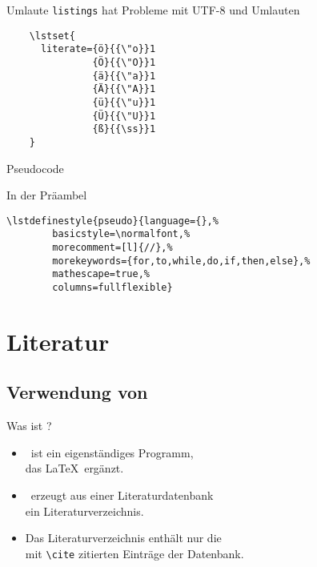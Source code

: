 \begin{Frame}[fragile]{Umlaute}
  \texttt{listings} hat Probleme mit UTF-8 und Umlauten
  \begin{lstlisting}[gobble=4]
    % german umlauts
    \lstset{
      literate={ö}{{\"o}}1
               {Ö}{{\"O}}1
               {ä}{{\"a}}1
               {Ä}{{\"A}}1
               {ü}{{\"u}}1
               {Ü}{{\"U}}1
               {ß}{{\ss}}1
    }
  \end{lstlisting}
\end{Frame}

\begin{Frame}[fragile]{Pseudocode}
  \begin{Block}{In der Präambel}
    \begin{lstlisting}[style=block,gobble=6]
      \lstdefinestyle{pseudo}{language={},%
        basicstyle=\normalfont,%
        morecomment=[l]{//},%
        morekeywords={for,to,while,do,if,then,else},%
        mathescape=true,%
        columns=fullflexible}
    \end{lstlisting}
  \end{Block}

  
  
\end{Frame}

\section{Literatur}

\subsection{Verwendung von \BibTeX}

\begin{Frame}[fragile]{Was ist \BibTeX?}
  \begin{itemize}
    \item \BibTeX\ ist ein \alert{eigenständiges Programm},\\
    das \LaTeX\ ergänzt.
    \item \BibTeX\ erzeugt aus einer \alert{Literaturdatenbank}\\
      ein \alert{Literaturverzeichnis}.
    \item Das Literaturverzeichnis enthält \alert{nur} die\\
      mit \lstinline-\cite- \alert{zitierten Einträge} der Datenbank.
  \end{itemize}
\end{Frame}

